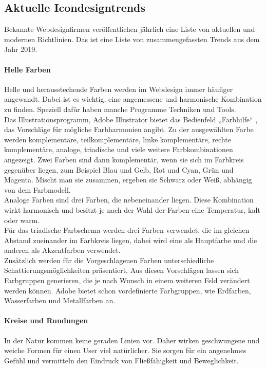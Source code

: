 \subsection{Aktuelle Icondesigntrends} 

Bekannte Webdesignfirmen veröffentlichen jährlich eine Liste von aktuellen und modernen Richtlinien. Das ist eine Liste von zusammengefassten Trends aus dem Jahr 2019. \cite{Icondesigntrends}



\paragraph{Helle Farben}
Helle und herausstechende Farben werden im Webdesign immer häufiger angewandt. Dabei ist es wichtig, eine angemessene und harmonische Kombination zu finden. Speziell dafür haben manche Programme Techniken und Tools.\\
Das Illustrationsprogramm, Adobe Illustrator bietet das Bedienfeld „Farbhilfe“ \cite{farbhilfeillustrator}, das Vorschläge für mögliche Farbharmonien angibt. Zu der ausgewählten Farbe werden komplementäre, teilkomplementäre, linke komplementäre, rechte komplementäre, analoge, triadische und viele weitere Farbkombinationen angezeigt. Zwei Farben sind dann komplementär, wenn sie sich im Farbkreis gegenüber liegen, zum Beispiel Blau und Gelb, Rot und Cyan, Grün und Magenta. Mischt man sie zusammen, ergeben sie Schwarz oder Weiß, abhängig von dem Farbmodell. \\Analoge Farben sind drei Farben, die nebeneinander liegen. Diese Kombination wirkt harmonisch und besitzt je nach der Wahl der Farben eine Temperatur, kalt oder warm. \\Für das triadische Farbschema werden drei Farben verwendet, die im gleichen Abstand zueinander im Farbkreis liegen, dabei wird eine als Hauptfarbe und die anderen als Akzentfarben verwendet.\\
Zusätzlich werden für die Vorgeschlagenen Farben unterschiedliche Schattierungsmöglichkeiten präsentiert. Aus diesen Vorschlägen lassen sich Farbgruppen generieren, die je nach Wunsch in einem weiteren Feld verändert werden können. Adobe bietet schon vordefinierte Farbgruppen, wie Erdfarben, Wasserfarben und Metallfarben an.

\paragraph{Kreise und Rundungen}
In der Natur kommen keine geraden Linien vor. Daher wirken geschwungene und weiche Formen für einen User viel natürlicher. Sie sorgen für ein angenehmes Gefühl und vermitteln den Eindruck von Fließfähigkeit und Beweglichkeit. 

